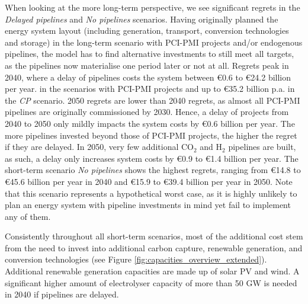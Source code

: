 \documentclass[pdflatex,sn-nature]{sn-jnl}
\theoremstyle{thmstyleone}%
\theoremstyle{thmstyletwo}%
\theoremstyle{thmstylethree}%
\begin{document}
When looking at the more long-term perspective, we see significant regrets in the \textit{Delayed pipelines} and \textit{No pipelines} scenarios. Having originally planned the energy system layout (including generation, transport, conversion technologies and storage) in the long-term scenario with PCI-PMI projects and/or endogenous pipelines, the model has to find alternative investments to still meet all targets, as the pipelines now materialise one period later or not at all. Regrets peak in 2040, where a delay of pipelines costs the system between €0.6 to €24.2 billion per year. in the scenarios with PCI-PMI projects and up to €35.2 billion p.a. in the \textit{CP} scenario. 2050 regrets are lower than 2040 regrets, as almost all PCI-PMI pipelines are originally commissioned by 2030. Hence, a delay of projects from 2040 to 2050 only mildly impacts the system costs by €0.6 billion per year. The more pipelines invested beyond those of PCI-PMI projects, the higher the regret if they are delayed. In 2050, very few additional CO$_2$ and H$_2$ pipelines are built, as such, a delay only increases system costs by €0.9 to €1.4 billion per year. 
The short-term scenario \textit{No pipelines} shows the highest regrets, ranging from €14.8 to €45.6 billion per year in 2040 and €15.9 to €39.4 billion per year in 2050. Note that this scenario represents a hypothetical worst case, as it is highly unlikely to plan an energy system with pipeline investments in mind yet fail to implement any of them.

Consistently throughout all short-term scenarios, most of the additional cost stem from the need to invest into additional carbon capture, renewable generation, and conversion technologies (see Figure \ref{fig:capacities_overview_extended}). Additional renewable generation capacities are made up of solar PV and wind. A significant higher amount of electrolyser capacity of more than 50 GW is needed in 2040 if pipelines are delayed. 
\end{document}

